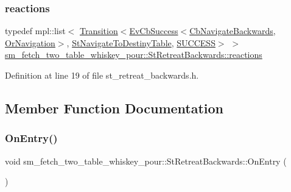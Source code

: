 \subsubsection{\texorpdfstring{reactions}{reactions}}
{\footnotesize\ttfamily typedef mpl\+::list$<$ \hyperlink{classsmacc_1_1Transition}{Transition}$<$\hyperlink{structsmacc_1_1EvCbSuccess}{Ev\+Cb\+Success}$<$\hyperlink{classcl__move__base__z_1_1CbNavigateBackwards}{Cb\+Navigate\+Backwards}, \hyperlink{classsm__fetch__two__table__whiskey__pour_1_1OrNavigation}{Or\+Navigation}$>$, \hyperlink{structsm__fetch__two__table__whiskey__pour_1_1StNavigateToDestinyTable}{St\+Navigate\+To\+Destiny\+Table}, \hyperlink{structsmacc_1_1default__transition__tags_1_1SUCCESS}{S\+U\+C\+C\+E\+SS}$>$ $>$ \hyperlink{structsm__fetch__two__table__whiskey__pour_1_1StRetreatBackwards_a78d6f52a57f100aa0a805788957df9e0}{sm\+\_\+fetch\+\_\+two\+\_\+table\+\_\+whiskey\+\_\+pour\+::\+St\+Retreat\+Backwards\+::reactions}}



Definition at line 19 of file st\+\_\+retreat\+\_\+backwards.\+h.



\subsection{Member Function Documentation}
\mbox{\label{structsm__fetch__two__table__whiskey__pour_1_1StRetreatBackwards_a8cb7900a7704cb7c38d4c9018c256e58}} 
\subsubsection{\texorpdfstring{On\+Entry()}{OnEntry()}}
{\footnotesize\ttfamily void sm\+\_\+fetch\+\_\+two\+\_\+table\+\_\+whiskey\+\_\+pour\+::\+St\+Retreat\+Backwards\+::\+On\+Entry (\begin{DoxyParamCaption}{ }\end{DoxyParamCaption})\hspace{0.3cm}{\ttfamily [inline]}}



